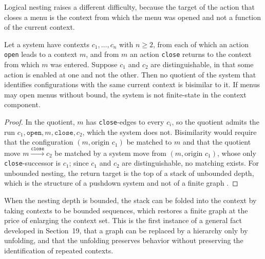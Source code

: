 Logical nesting raises a different difficulty, because the target of the action that closes a menu is the context from which the menu was opened and not a function of the current context.

\begin{proposition}\label{prop:modal}
Let a system have contexts $c_1,\dots,c_n$ with $n\ge2$, from each of which an action \texttt{open} leads to a context $m$, and from $m$ an action \texttt{close} returns to the context from which $m$ was entered. Suppose $c_1$ and $c_2$ are distinguishable, in that some action is enabled at one and not the other. Then no quotient of the system that identifies configurations with the same current context is bisimilar to it. If menus may open menus without bound, the system is not finite-state in the context component.
\end{proposition}
\begin{proof}
In the quotient, $m$ has \texttt{close}-edges to every $c_i$, so the quotient admits the run $c_1,\texttt{open},m,\texttt{close},c_2$, which the system does not. Bisimilarity would require that the configuration $(m,\text{origin }c_1)$ be matched to $m$ and that the quotient move $m\xrightarrow{\texttt{close}}c_2$ be matched by a system move from $(m,\text{origin }c_1)$, whose only \texttt{close}-successor is $c_1$; since $c_1$ and $c_2$ are distinguishable, no matching exists. For unbounded nesting, the return target is the top of a stack of unbounded depth, which is the structure of a pushdown system and not of a finite graph \cite{vpa}.
\end{proof}

When the nesting depth is bounded, the stack can be folded into the context by taking contexts to be bounded sequences, which restores a finite graph at the price of enlarging the context set. This is the first instance of a general fact developed in Section~19, that a graph can be replaced by a hierarchy only by unfolding, and that the unfolding preserves behavior without preserving the identification of repeated contexts.
